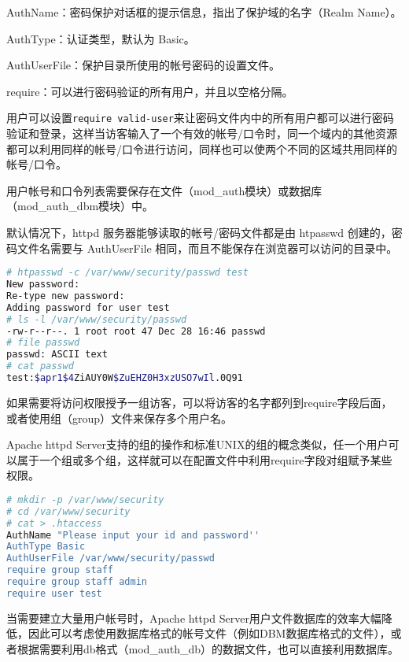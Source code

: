 \begin{compactitem}
\item AuthName：密码保护对话框的提示信息，指出了保护域的名字（Realm Name）。
\item AuthType：认证类型，默认为 Basic。
\item AuthUserFile：保护目录所使用的帐号密码的设置文件。
\item require：可以进行密码验证的所有用户，并且以空格分隔。
\end{compactitem}

用户可以设置\texttt{require valid-user}来让密码文件内中的所有用户都可以进行密码验证和登录，这样当访客输入了一个有效的帐号/口令时，同一个域内的其他资源都可以利用同样的帐号/口令进行访问，同样也可以使两个不同的区域共用同样的帐号/口令。

用户帐号和口令列表需要保存在文件（mod\_auth模块）或数据库（mod\_auth\_dbm模块）中。

默认情况下，httpd 服务器能够读取的帐号/密码文件都是由 htpasswd 创建的，密码文件名需要与 AuthUserFile 相同，而且不能保存在浏览器可以访问的目录中。



\begin{lstlisting}[language=bash]
# htpasswd -c /var/www/security/passwd test
New password:
Re-type new password:
Adding password for user test
# ls -l /var/www/security/passwd
-rw-r--r--. 1 root root 47 Dec 28 16:46 passwd
# file passwd 
passwd: ASCII text
# cat passwd
test:$apr1$4ZiAUY0W$ZuEHZ0H3xzUSO7wIl.0Q91
\end{lstlisting}

如果需要将访问权限授予一组访客，可以将访客的名字都列到require字段后面，或者使用组（group）文件来保存多个用户名。

Apache httpd Server支持的组的操作和标准UNIX的组的概念类似，任一个用户可以属于一个组或多个组，这样就可以在配置文件中利用require字段对组赋予某些权限。

\begin{lstlisting}[language=bash]
# mkdir -p /var/www/security
# cd /var/www/security
# cat > .htaccess
AuthName "Please input your id and password''
AuthType Basic
AuthUserFile /var/www/security/passwd
require group staff
require group staff admin
require user test
\end{lstlisting}

当需要建立大量用户帐号时，Apache httpd Server用户文件数据库的效率大幅降低，因此可以考虑使用数据库格式的帐号文件（例如DBM数据库格式的文件），或者根据需要利用db格式（mod\_auth\_db）的数据文件，也可以直接利用数据库。

